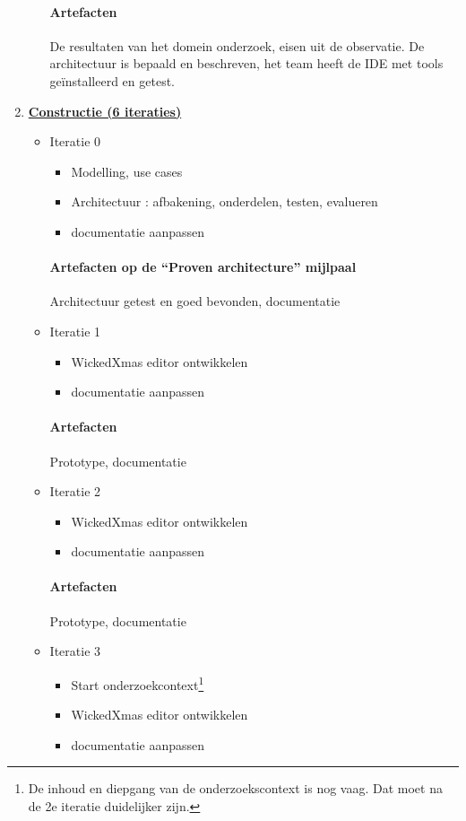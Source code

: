 \begin{enumerate}
\begin{itemize}
		\paragraph{Artefacten}
		De resultaten van het domein onderzoek, eisen uit de observatie.
		De architectuur is bepaald en beschreven, het team heeft de IDE met tools
		ge\"{i}nstalleerd en getest.
		\end{itemize}


\item \underline{\textbf{Constructie (6 iteraties)}}
	\begin{itemize}
	\item Iteratie 0
		\begin{itemize}
		\item Modelling,  use cases
		\item Architectuur : afbakening,  onderdelen,  testen, evalueren
		\item documentatie aanpassen
		\end{itemize}
		\paragraph{Artefacten op de ``Proven architecture'' mijlpaal}
		 Architectuur getest en goed bevonden, documentatie
	\item Iteratie 1
		\begin{itemize}
		\item WickedXmas editor ontwikkelen
		\item documentatie aanpassen
		\end{itemize}
		\paragraph{Artefacten}
		Prototype, documentatie
	\item Iteratie 2
		\begin{itemize}
		\item WickedXmas editor ontwikkelen
		\item documentatie aanpassen
		\end{itemize}
		\paragraph{Artefacten}
		Prototype, documentatie
	\item Iteratie 3
		\begin{itemize}
		\item Start onderzoekcontext\footnote{De inhoud en diepgang van de onderzoekscontext is nog vaag. Dat moet na de 2e iteratie
		duidelijker zijn.}
		\item WickedXmas editor ontwikkelen
		\item documentatie aanpassen
		\end{itemize}

\end{itemize}
\end{enumerate}
